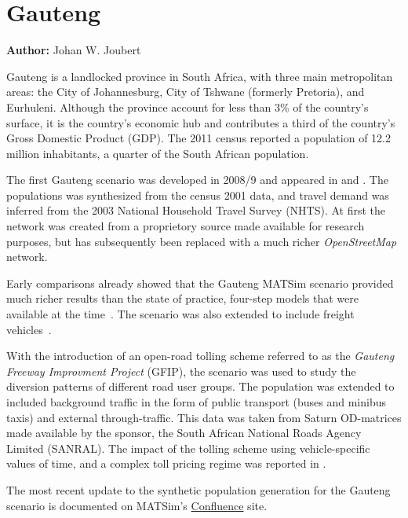\section{Gauteng}
\label{sec:gauteng}
\hfill \textbf{Author:} Johan W. Joubert

Gauteng is a landlocked province in South Africa, with  three main metropolitan areas: the City of Johannesburg, City of Tshwane (formerly Pretoria), and Eurhuleni. Although the province account for less than 3\% of the country's surface, it is the country's economic hub and contributes a third of the country's Gross Domestic Product (GDP). The 2011 census reported a population of 12.2 million inhabitants, a quarter of the South African population. 

The first Gauteng scenario was developed in 2008/9 and appeared in \citet[][]{Fourie2009MastersThesis} and \citet[][]{FourieJoubert_SATC_2009}.  The populations was synthesized from the census 2001 data, and travel demand was inferred from the 2003 National Household Travel Survey (NHTS). At first the network was created from a proprietory source made available for research purposes, but has subsequently been replaced with a much richer \emph{OpenStreetMap} network.

Early comparisons already showed that the Gauteng MATSim scenario provided much richer results than the state of practice, four-step models that were available at the time~\citep[][]{Fourie_SATC_2010}. The scenario was also extended to include freight vehicles~\citep[][]{JoubertJEtAl_TRR_2010}.

With the introduction of an open-road tolling scheme referred to as the \emph{Gauteng Freeway Improvment Project} (GFIP), the scenario was used to study the diversion patterns of different road user groups. The population was extended to included background traffic in the form of public transport (buses and minibus taxis) and external through-traffic. This data was taken from Saturn OD-matrices made available by the sponsor, the South African National Roads Agency Limited (SANRAL). The impact of the tolling scheme using vehicle-specific values of time, and a complex toll pricing regime was reported in \citet[][]{NagelKickhoeferJoubert2014HeterogeneousVoTsPROCEDIA}.

The most recent update to the synthetic population generation for the Gauteng scenario is documented on MATSim's \href{https://matsim.atlassian.net/wiki/display/MATPUB/South+Africa}{Confluence} site.

